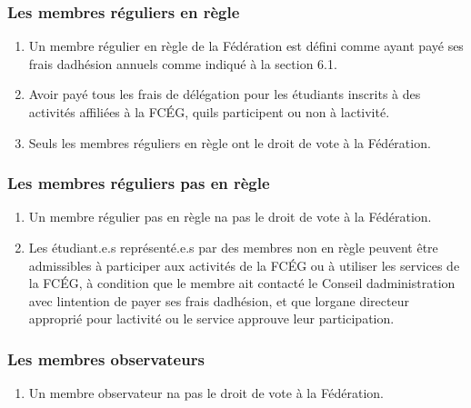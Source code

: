 \subsubsection{Les membres réguliers en règle}
\label{les-membres-reguliers-en-regle}

\begin{enumerate}
 \item
  Un membre régulier en règle de la Fédération est défini comme ayant payé ses frais d\textquotesingle adhésion annuels comme indiqué à la section 6.1.
 \item
  Avoir payé tous les frais de délégation pour les étudiants inscrits à des activités affiliées à la FCÉG, qu\textquotesingle ils participent ou non à l\textquotesingle activité.
 \item
  Seuls les membres réguliers en règle ont le droit de vote à la Fédération.
\end{enumerate}

\subsubsection{Les membres réguliers pas en règle}
\label{les-membres-reguliers-pas-en-regle}

\begin{enumerate}
 \item
  Un membre régulier pas en règle n\textquotesingle a pas le droit de vote à la Fédération.
 \item
  Les étudiant.e.s représenté.e.s par des membres non en règle peuvent être admissibles à participer aux activités de la FCÉG ou à utiliser les services de la FCÉG, à condition que le membre ait contacté le Conseil d\textquotesingle administration avec l\textquotesingle intention de payer ses frais d\textquotesingle adhésion, et que l\textquotesingle organe directeur approprié pour l\textquotesingle activité ou le service approuve leur participation.
\end{enumerate}

\subsubsection{Les membres observateurs}
\label{les-membres-observateurs}

\begin{enumerate}
 \item
  Un membre observateur n\textquotesingle a pas le droit de vote à la Fédération.
\end{enumerate}

